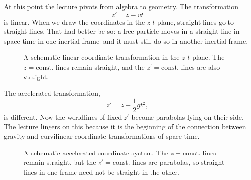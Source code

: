 At this point the lecture pivots from algebra to geometry.  The transformation
\[
z' = z - vt
\]
is linear.  When we draw the coordinates in the \(z\)-\(t\) plane, straight lines go to straight lines.  That had better be so: a free particle moves in a straight line in space-time in one inertial frame, and it must still do so in another inertial frame.

\begin{figure}[htbp]
\centering
{}
\caption{A schematic linear coordinate transformation in the \(z\)-\(t\) plane.  The \(z=\mathrm{const.}\) lines remain straight, and the \(z'=\mathrm{const.}\) lines are also straight.}
\end{figure}

The accelerated transformation,
\[
z' = z - \frac{1}{2}gt^2,
\]
is different.  Now the worldlines of fixed \(z'\) become parabolas lying on their side.  The lecture lingers on this because it is the beginning of the connection between gravity and curvilinear coordinate transformations of space-time.

\begin{figure}[htbp]
\centering
{}
\caption{A schematic accelerated coordinate system.  The \(z=\mathrm{const.}\) lines remain straight, but the \(z'=\mathrm{const.}\) lines are parabolas, so straight lines in one frame need not be straight in the other.}
\end{figure}

